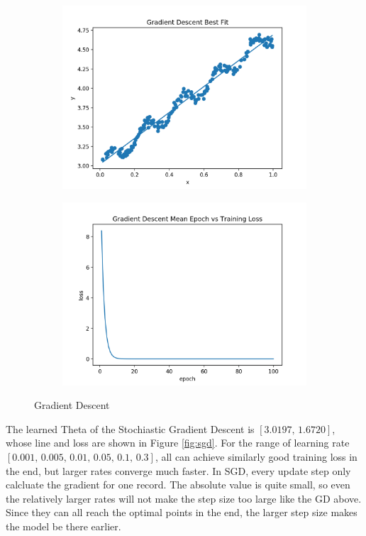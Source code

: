 \documentclass[11pt]{article}
\begin{document}
\begin{enumerate}
\begin{figure}[!h]
    \centering
    \begin{subfigure}[b]{0.4\linewidth}
      \includegraphics[width=\linewidth]{figures/gd.png}
    \end{subfigure}
    \begin{subfigure}[b]{0.4\linewidth}
      \includegraphics[width=\linewidth]{figures/gd_loss.png}
    \end{subfigure}
    \caption{Gradient Descent}
    \label{fig:gd}
\end{figure}

The learned Theta of the Stochiastic Gradient Descent is $[3.0197,\, 1.6720]$, whose line and loss are shown in Figure \ref{fig:sgd}. For the range of learning rate $[0.001,\, 0.005,\, 0.01,\, 0.05,\, 0.1,\, 0.3]$, all can achieve similarly good training loss in the end, but larger rates converge much faster. In SGD, every update step only calcluate the gradient for one record. The absolute value is quite small, so even the relatively larger rates will not make the step size too large like the GD above. Since they can all reach the optimal points in the end, the larger step size makes the model be there earlier.
\medskip


\end{enumerate}
\end{document}
